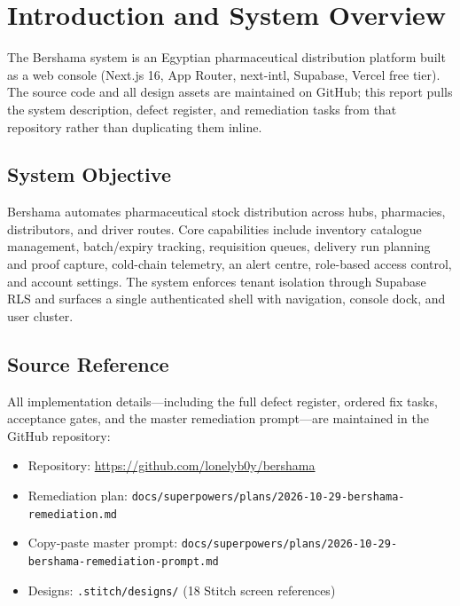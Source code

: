 \documentclass[12pt, a4paper]{article}
\begin{document}
\clearpage


\section{Introduction and System Overview}

The Bershama system is an Egyptian pharmaceutical distribution platform built as a web console (Next.js 16, App Router, next-intl, Supabase, Vercel free tier). The source code and all design assets are maintained on GitHub; this report pulls the system description, defect register, and remediation tasks from that repository rather than duplicating them inline.

\subsection{System Objective}

Bershama automates pharmaceutical stock distribution across hubs, pharmacies, distributors, and driver routes. Core capabilities include inventory catalogue management, batch/expiry tracking, requisition queues, delivery run planning and proof capture, cold-chain telemetry, an alert centre, role-based access control, and account settings. The system enforces tenant isolation through Supabase RLS and surfaces a single authenticated shell with navigation, console dock, and user cluster.

\subsection{Source Reference}

All implementation details---including the full defect register, ordered fix tasks, acceptance gates, and the master remediation prompt---are maintained in the GitHub repository:

\begin{itemize}
    \item Repository: \url{https://github.com/lonelyb0y/bershama}
    \item Remediation plan: \texttt{docs/superpowers/plans/2026-10-29-bershama-remediation.md}
    \item Copy-paste master prompt: \texttt{docs/superpowers/plans/2026-10-29-bershama-remediation-prompt.md}
    \item Designs: \texttt{.stitch/designs/} (18 Stitch screen references)
\end{itemize}
\end{document}
